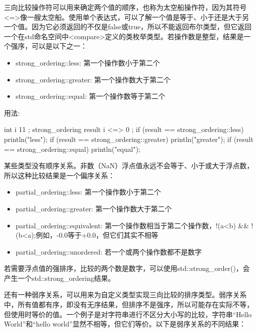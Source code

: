 
三向比较操作符可以用来确定两个值的顺序，也称为太空船操作符，因为其符号<=>像一艘太空船。使用单个表达式，可以了解一个值是等于、小于还是大于另一个值。因为它必须返回的不仅是false或true，所以不能返回布尔类型，但它返回一个在std命名空间中<compare>定义的类枚举类型。若操作数是整型，结果是一个强序，可以是以下之一：

\begin{itemize}
\item
strong\_ordering::less: 第一个操作数小于第二个

\item
strong\_ordering::greater: 第一个操作数大于第二个

\item
strong\_ordering::equal: 第一个操作数等于第二个
\end{itemize}

用法:

\begin{cpp}
int i { 11 };
strong_ordering result { i <=> 0 };
if (result == strong_ordering::less) { println("less"); }
if (result == strong_ordering::greater) { println("greater"); }
if (result == strong_ordering::equal) { println("equal"); }
\end{cpp}

某些类型没有顺序关系。非数（NaN）浮点值永远不会等于、小于或大于浮点数，所以这种比较结果是一个偏序关系：

\begin{itemize}
\item
partial\_ordering::less: 第一个操作数小于第二个

\item
partial\_ordering::greater: 第一个操作数大于第二个

\item
partial\_ordering::equivalent: 第一个操作数相当于第二个操作数，!(a<b) \&\& !(b<a);例如，-0.0等于+0.0，但它们其实不相等

\item
partial\_ordering::unordered: 若一个或两个操作数都不是数字
\end{itemize}

若需要浮点值的强排序，比较的两个数是数字，可以使用std::strong\_order()，会产生一个std::strong\_ordering结果。

还有一种弱序关系，可以用来为自定义类型实现三向比较的排序类型。弱序关系中，所有值都有序，即没有无序结果，但排序不是强序，所以可能存在实际不等，但使用时等价的值。一个例子是对字符串进行不区分大小写的比较，字符串“Hello World”和“hello world”显然不相等，但它们等价。以下是弱序关系的不同结果：

